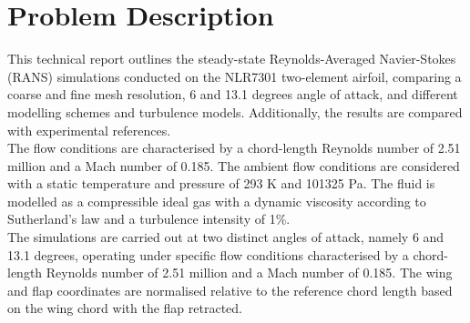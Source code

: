 \section{Problem Description}

This technical report outlines the steady-state Reynolds-Averaged Navier-Stokes (RANS) simulations conducted on the NLR7301 two-element airfoil, comparing a coarse and fine mesh resolution, 6 and 13.1 degrees angle of attack, and different modelling schemes and turbulence models. Additionally, the results are compared with experimental references. \\

The flow conditions are characterised by a chord-length Reynolds number of 2.51 million and a Mach number of 0.185. The ambient flow conditions are considered with a static temperature and pressure of 293 K and 101325 Pa. The fluid is modelled as a compressible ideal gas with a dynamic viscosity according to Sutherland's law and a turbulence intensity of 1\%. \\

The simulations are carried out at two distinct angles of attack, namely 6 and 13.1 degrees, operating under specific flow conditions characterised by a chord-length Reynolds number of 2.51 million and a Mach number of 0.185. The wing and flap coordinates are normalised relative to the reference chord length based on the wing chord with the flap retracted.